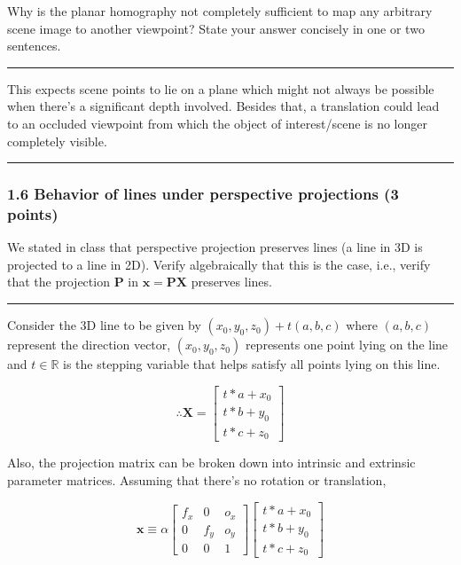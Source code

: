 \documentclass[11pt]{article}
\begin{document}
Why is the planar homography not completely sufficient to map any
arbitrary scene image to another viewpoint? State your answer concisely
in one or two sentences.

    \begin{center}\rule{0.5\linewidth}{0.5pt}\end{center}

This expects scene points to lie on a plane which might not always be
possible when there's a significant depth involved. Besides that, a
translation could lead to an occluded viewpoint from which the object of
interest/scene is no longer completely visible.

\begin{center}\rule{0.5\linewidth}{0.5pt}\end{center}

    \hypertarget{behavior-of-lines-under-perspective-projections-3-points}{%
\subsubsection{1.6 Behavior of lines under perspective projections (3
points)}\label{behavior-of-lines-under-perspective-projections-3-points}}

We stated in class that perspective projection preserves lines (a line
in 3D is projected to a line in 2D). Verify algebraically that this is
the case, i.e., verify that the projection \(\mathbf{P}\) in
\(\mathbf{x} = \mathbf{PX}\) preserves lines.

    \begin{center}\rule{0.5\linewidth}{0.5pt}\end{center}

Consider the 3D line to be given by \((x_0, y_0, z_0) + t(a, b, c)\)
where \((a, b, c)\) represent the direction vector, \((x_0, y_0, z_0)\)
represents one point lying on the line and \(t \in \mathbb{R}\) is the
stepping variable that helps satisfy all points lying on this line.

\[\therefore \mathbf{X} = \begin{bmatrix} t*a + x_0 \\t*b + y_0 \\ t*c + z_0 \end{bmatrix}\]

Also, the projection matrix can be broken down into intrinsic and
extrinsic parameter matrices. Assuming that there's no rotation or
translation,

\[\mathbf{x} \equiv 
\alpha \begin{bmatrix} f_x & 0 & o_x \\ 0 & f_y & o_y \\ 0 & 0 & 1\end{bmatrix}
\begin{bmatrix} t*a + x_0 \\t*b + y_0 \\ t*c + z_0 \end{bmatrix}\]
\end{document}
